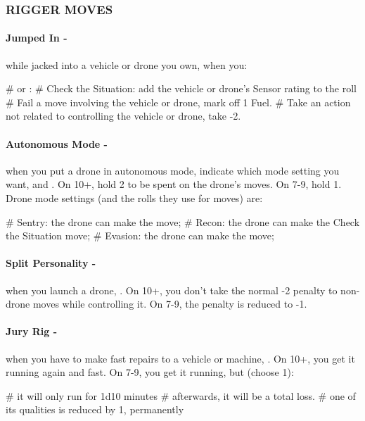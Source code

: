 \subsubsection{RIGGER MOVES}
\paragraph{Jumped In -} while jacked into a vehicle or drone you own, when you:
    \begin{easylist}
        #  or : 
        # Check the Situation: add the vehicle or drone’s Sensor rating to the roll
        # Fail a move involving the vehicle or drone, mark off 1 Fuel.
        # Take an action not related to controlling the vehicle or drone, take -2.
    \end{easylist}

\paragraph{Autonomous Mode -} when you put a drone in autonomous mode, indicate which mode setting you want, and . On 10+, hold 2 to be spent on the drone’s moves. On 7-9, hold 1. Drone mode settings (and the rolls they use for moves) are:
    \begin{easylist}
        # Sentry: the drone can make the  move; 
        # Recon: the drone can make the Check the Situation move; 
        # Evasion: the drone can make the  move; 
    \end{easylist}

\paragraph{Split Personality -} when you launch a drone, . On 10+, you don’t take the normal -2 penalty to non-drone moves while controlling it. On 7-9, the penalty is reduced to -1.

\paragraph{Jury Rig -} when you have to make fast repairs to a vehicle or machine, . On 10+, you get it running again and fast. On 7-9, you get it running, but (choose 1):
    \begin{easylist}
        # it will only run for 1d10 minutes
        # afterwards, it will be a total loss.
        # one of its qualities is reduced by 1, permanently
    \end{easylist}

